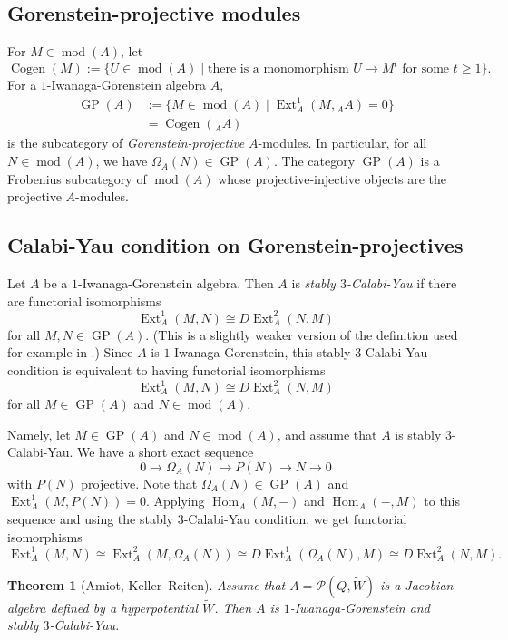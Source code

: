 \documentclass[12pt,reqno]{amsart}
\newtheorem{Thm}{Theorem}[section]
\theoremstyle{definition}
\newcommand{\cP}{{\mathcal P}}
\newcommand{\md}{\operatorname{mod}}
\newcommand{\Jacobi}{\cP}
\newcommand{\cogen}{\operatorname{Cogen}}
\newcommand{\GP}{\operatorname{GP}}
\newcommand{\Hom}{\operatorname{Hom}}
\newcommand{\Ext}{\operatorname{Ext}}
\begin{document}
\subsection{Gorenstein-projective modules}
For $M \in \md(A)$, let
$$
\cogen(M) := \{ U \in \md(A) \mid \text{there is a monomorphism $U \to M^t$ for some $t \ge 1$} \}.
$$
For a $1$-Iwanaga-Gorenstein algebra $A$,   
\begin{align*}
\GP(A) &:= \{ M \in \md(A) \mid \Ext_A^1(M,{_A}A) = 0 \}
\\
&= \cogen({_A}A)
\end{align*}
is the subcategory of \emph{Gorenstein-projective} $A$-modules.
In particular, for all $N \in \md(A)$, we have $\Omega_A(N) \in \GP(A)$.
The category $\GP(A)$
is a Frobenius subcategory of $\md(A)$ whose projective-injective objects
are the projective $A$-modules.

\subsection{Calabi-Yau condition on Gorenstein-projectives}
Let $A$ be a $1$-Iwanaga-Gorenstein algebra.
Then $A$
is \emph{stably $3$-Calabi-Yau} if there are functorial isomorphisms
$$
\Ext_A^1(M,N) \cong D\!\Ext_A^2(N,M) 
$$
for all $M,N \in \GP(A)$.
(This is a slightly weaker version of the definition used for example in \cite{KR07}.)
Since $A$ is $1$-Iwanaga-Gorenstein, this stably $3$-Calabi-Yau condition is equivalent to having functorial isomorphisms
$$
\Ext_A^1(M,N) \cong D\!\Ext_A^2(N,M) 
$$
for all $M \in \GP(A)$ and $N \in \md(A)$.

Namely, let $M \in \GP(A)$ and $N \in \md(A)$, and assume that $A$ is stably $3$-Calabi-Yau.
We have a short exact sequence
$$
0 \to \Omega_A(N) \to P(N) \to N \to 0
$$
with $P(N)$ projective.
Note that $\Omega_A(N) \in \GP(A)$ and $\Ext_A^1(M,P(N)) = 0$.
Applying $\Hom_A(M,-)$ and $\Hom_A(-,M)$ to this sequence and using the stably $3$-Calabi-Yau condition,
we get functorial isomorphisms
$$
\Ext_A^1(M,N) \cong \Ext_A^2(M,\Omega_A(N))
\cong D\!\Ext_A^1(\Omega_A(N),M)
\cong D\!\Ext_A^2(N,M).
$$


\begin{Thm}[Amiot, Keller--Reiten]\label{thm:Jacobi3CY}
Assume that $A = \Jacobi(Q,\tilde{W})$ is a Jacobian algebra defined by a hyperpotential $\tilde{W}$.
Then $A$ is $1$-Iwanaga-Gorenstein and stably
$3$-Calabi-Yau.
\end{Thm}
\end{document}
